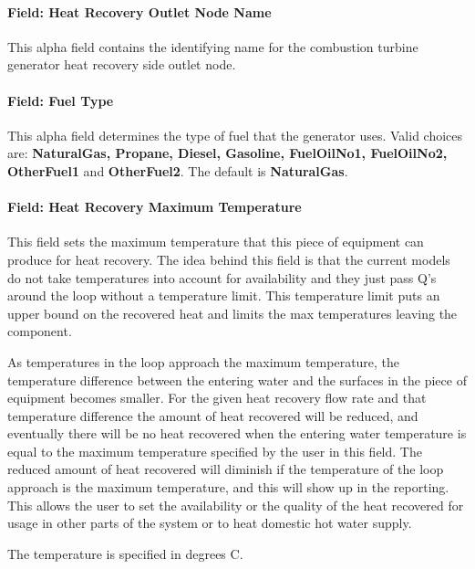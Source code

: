 \paragraph{Field: Heat Recovery Outlet Node Name}\label{field-heat-recovery-outlet-node-name-1}

This alpha field contains the identifying name for the combustion turbine generator heat recovery side outlet node.

\paragraph{Field: Fuel Type}\label{field-fuel-type-1}

This alpha field determines the type of fuel that the generator uses. Valid choices are: \textbf{NaturalGas, Propane, Diesel, Gasoline, FuelOilNo1, FuelOilNo2, OtherFuel1} and \textbf{OtherFuel2}. The default is \textbf{NaturalGas}.

\paragraph{Field: Heat Recovery Maximum Temperature}\label{field-heat-recovery-maximum-temperature-1}

This field sets the maximum temperature that this piece of equipment can produce for heat recovery. The idea behind this field is that the current models do not take temperatures into account for availability and they just pass Q's around the loop without a temperature limit. This temperature limit puts an upper bound on the recovered heat and limits the max temperatures leaving the component.

As temperatures in the loop approach the maximum temperature, the temperature difference between the entering water and the surfaces in the piece of equipment becomes smaller. For the given heat recovery flow rate and that temperature difference the amount of heat recovered will be reduced, and eventually there will be no heat recovered when the entering water temperature is equal to the maximum temperature specified by the user in this field. The reduced amount of heat recovered will diminish if the temperature of the loop approach is the maximum temperature, and this will show up in the reporting. This allows the user to set the availability or the quality of the heat recovered for usage in other parts of the system or to heat domestic hot water supply.

The temperature is specified in degrees C.

